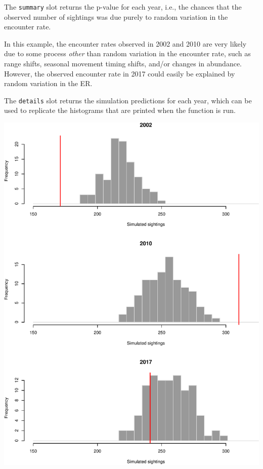 \documentclass[
]{book}
\newenvironment{Shaded}{\begin{snugshade}}{\end{snugshade}}
\newcommand{\DecValTok}[1]{\textcolor[rgb]{0.00,0.00,0.81}{#1}}
\newcommand{\FloatTok}[1]{\textcolor[rgb]{0.00,0.00,0.81}{#1}}
\newcommand{\NormalTok}[1]{#1}
\newcommand{\OperatorTok}[1]{\textcolor[rgb]{0.81,0.36,0.00}{\textbf{#1}}}
\begin{document}
The \texttt{summary} slot returns the p-value for each year, i.e., the chances that the observed number of sightings was due purely to random variation in the encounter rate.

\begin{Shaded}
\end{Shaded}

In this example, the encounter rates observed in 2002 and 2010 are very likely due to some process \emph{other} than random variation in the encounter rate, such as range shifts, seasonal movement timing shifts, and/or changes in abundance. However, the observed encounter rate in 2017 could easily be explained by random variation in the ER.

The \texttt{details} slot returns the simulation predictions for each year, which can be used to replicate the histograms that are printed when the function is run.

\includegraphics{figures/unnamed-chunk-212-1.pdf}
\end{document}
